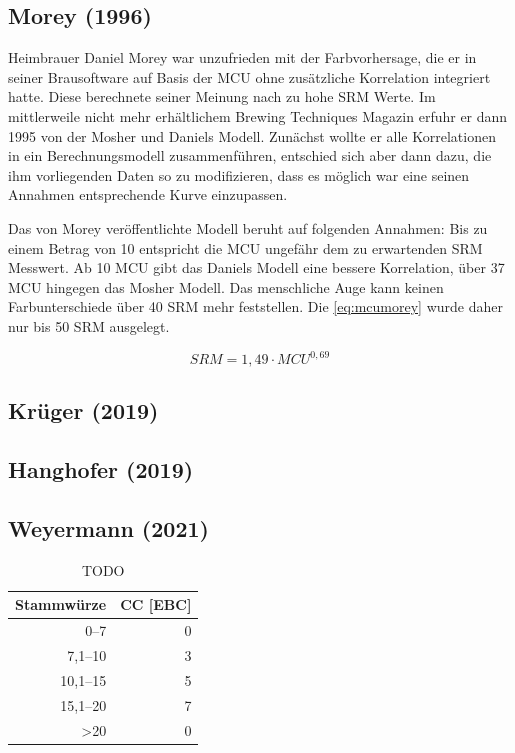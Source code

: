 \documentclass[a4paper,parskip=half]{scrartcl}
\newcommand{\MCU}{\mathit{MCU}}
\newcommand{\SRM}{\mathit{SRM}}
\begin{document}
\subsection*{Morey (1996)}

Heimbrauer Daniel Morey war unzufrieden mit der Farbvorhersage, die er in seiner Brausoftware auf Basis der MCU ohne zusätzliche Korrelation integriert hatte. Diese berechnete seiner Meinung nach zu hohe SRM Werte. Im mittlerweile nicht mehr erhältlichem Brewing Techniques Magazin erfuhr er dann 1995 von der Mosher und Daniels Modell. Zunächst wollte er alle Korrelationen in ein Berechnungsmodell zusammenführen, entschied sich aber dann dazu, die ihm vorliegenden Daten so zu modifizieren, dass es möglich war eine seinen Annahmen entsprechende Kurve einzupassen. \parencite{Smith2010}

Das von Morey veröffentlichte Modell beruht auf folgenden Annahmen: Bis zu einem Betrag von 10 entspricht die MCU ungefähr dem zu erwartenden SRM Messwert. Ab 10 MCU gibt das Daniels Modell eine bessere Korrelation, über 37 MCU hingegen das Mosher Modell. Das menschliche Auge kann keinen Farbunterschiede über 40 SRM mehr feststellen. Die \autoref{eq:mcumorey} wurde daher nur bis 50 SRM ausgelegt.
\parencite{Morey}

\begin{equation}
\SRM = 1,49 \cdot \MCU^{0,69}
\label{eq:mcumorey}
\end{equation}

\subsection*{Krüger (2019)}



\subsection*{Hanghofer (2019)}

\parencite[78]{Hanghofer2019}



\subsection*{Weyermann (2021)}

\parencite{KrausWeyermann2021b}

\begin{table}[H]
\centering
\begin{tabular}{rr}
\toprule
\multicolumn{1}{c}{\textbf{Stammwürze}} & \multicolumn{1}{c}{\textbf{CC [EBC]}} \\
\midrule
0–7 & 0 \\
7,1–10 & 3 \\
10,1–15 & 5 \\
15,1–20 & 7 \\
>20 & 0 \\
\bottomrule
\end{tabular}
\caption{TODO \parencite{KrausWeyermann2021b}}
\label{table:ccweyermann}
\end{table}
\end{document}
